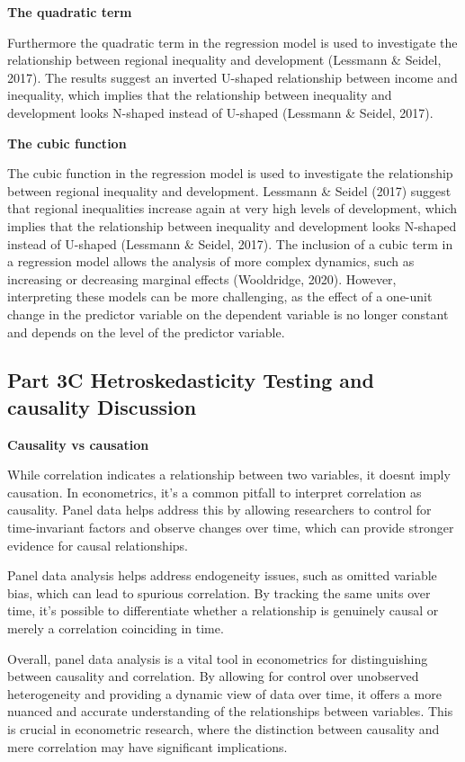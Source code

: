 \documentclass[
  a4paper,
  DIV=11,
  numbers=noendperiod]{scrartcl}
\begin{document}
\textbf{The quadratic term}

Furthermore the quadratic term in the regression model is used to
investigate the relationship between regional inequality and development
(Lessmann \& Seidel, 2017). The results suggest an inverted U-shaped
relationship between income and inequality, which implies that the
relationship between inequality and development looks N-shaped instead
of U-shaped (Lessmann \& Seidel, 2017).

\textbf{The cubic function}

The cubic function in the regression model is used to investigate the
relationship between regional inequality and development. Lessmann \&
Seidel (2017) suggest that regional inequalities increase again at very
high levels of development, which implies that the relationship between
inequality and development looks N-shaped instead of U-shaped (Lessmann
\& Seidel, 2017). The inclusion of a cubic term in a regression model
allows the analysis of more complex dynamics, such as increasing or
decreasing marginal effects (Wooldridge, 2020). However, interpreting
these models can be more challenging, as the effect of a one-unit change
in the predictor variable on the dependent variable is no longer
constant and depends on the level of the predictor variable.

\hypertarget{part-3c-hetroskedasticity-testing-and-causality-discussion}{%
\subsection{Part 3C Hetroskedasticity Testing and causality
Discussion}\label{part-3c-hetroskedasticity-testing-and-causality-discussion}}

\textbf{Causality vs causation}

While correlation indicates a relationship between two variables, it
doesn\textquotesingle t imply causation. In econometrics, it's a common
pitfall to interpret correlation as causality. Panel data helps address
this by allowing researchers to control for time-invariant factors and
observe changes over time, which can provide stronger evidence for
causal relationships.

Panel data analysis helps address endogeneity issues, such as omitted
variable bias, which can lead to spurious correlation. By tracking the
same units over time, it's possible to differentiate whether a
relationship is genuinely causal or merely a correlation coinciding in
time.

Overall, panel data analysis is a vital tool in econometrics for
distinguishing between causality and correlation. By allowing for
control over unobserved heterogeneity and providing a dynamic view of
data over time, it offers a more nuanced and accurate understanding of
the relationships between variables. This is crucial in econometric
research, where the distinction between causality and mere correlation
may have significant implications.
\end{document}
